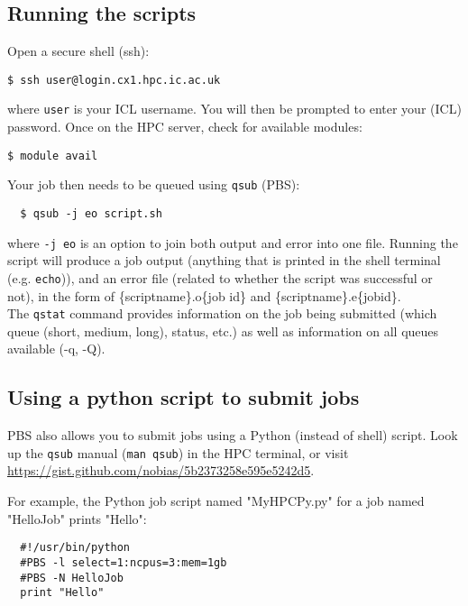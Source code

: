 \subsection{Running the scripts}

Open a secure shell (ssh):

\begin{lstlisting}
$ ssh user@login.cx1.hpc.ic.ac.uk
\end{lstlisting}

where {\tt user} is your ICL username. You will then be prompted to enter your (ICL) password. Once on the HPC server, check for available modules:

\begin{lstlisting}
$ module avail
\end{lstlisting}

Your job then needs to be queued using {\tt qsub} (PBS):

\begin{lstlisting}
  $ qsub -j eo script.sh
\end{lstlisting}

where {\tt -j eo} is an option to join both output and error into one 
file. Running the script will produce a job output (anything that is 
printed in the shell terminal (e.g. {\tt echo})), and an error file 
(related to whether the script was successful or not), in the form of 
\{scriptname\}.o\{job id\} and \{scriptname\}.e\{jobid\}.\\

The {\tt qstat} command provides information on the job being submitted 
(which queue (short, medium, long), status, etc.) as well as 
information on all queues available (-q, -Q).

\subsection{Using a python script to submit jobs}
PBS also  allows  you  to  submit jobs using a Python (instead of 
shell) script. Look up the {\tt qsub} manual ({\tt man qsub}) in the 
HPC terminal, or visit 
\url{https://gist.github.com/nobias/5b2373258e595e5242d5}.

For example, the Python job script named  "MyHPCPy.py"  for  a  job  named  "HelloJob" prints "Hello":

\begin{lstlisting}
  #!/usr/bin/python
  #PBS -l select=1:ncpus=3:mem=1gb
  #PBS -N HelloJob
  print "Hello"
\end{lstlisting}

